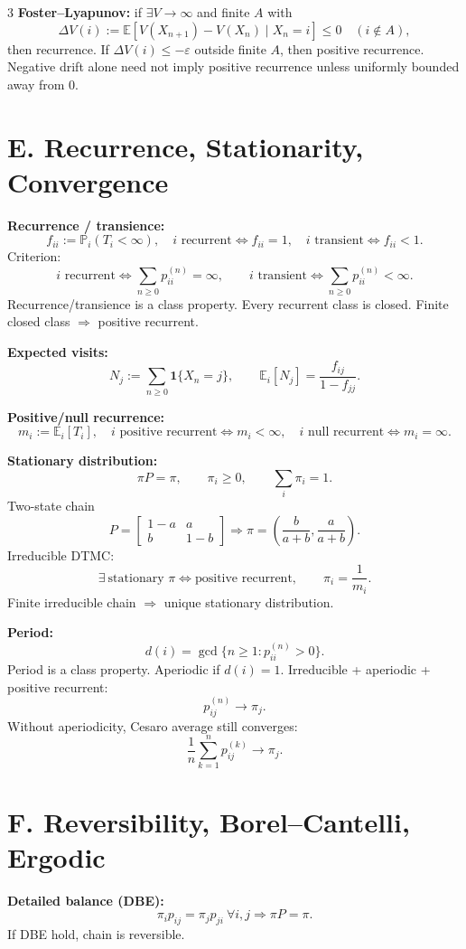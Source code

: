\documentclass[8pt]{extarticle}
\newcommand{\PP}{\mathbb{P}}
\newcommand{\E}{\mathbb{E}}
\newcommand{\1}{\mathbf{1}}
\begin{document}
\begin{multicols*}{3}
\textbf{Foster--Lyapunov:} if $\exists V\to\infty$ and finite $A$ with
\[
\Delta V(i):=\E[V(X_{n+1})-V(X_n)\mid X_n=i]\le0 \quad (i\notin A),
\]
then recurrence. If $\Delta V(i)\le-\varepsilon$ outside finite $A$, then positive recurrence.
Negative drift alone need not imply positive recurrence unless uniformly bounded away from $0$.

\section*{E. Recurrence, Stationarity, Convergence}
\textbf{Recurrence / transience:}
\[
f_{ii}:=\PP_i(T_i<\infty),\quad
i\text{ recurrent}\iff f_{ii}=1,\quad
i\text{ transient}\iff f_{ii}<1.
\]
Criterion:
\[
i\text{ recurrent}\iff \sum_{n\ge0}p_{ii}^{(n)}=\infty,
\qquad
i\text{ transient}\iff \sum_{n\ge0}p_{ii}^{(n)}<\infty.
\]
Recurrence/transience is a class property.
Every recurrent class is closed. Finite closed class $\Rightarrow$ positive recurrent.

\textbf{Expected visits:}
\[
N_j:=\sum_{n\ge0}\1\{X_n=j\},\qquad
\E_i[N_j]=\frac{f_{ij}}{1-f_{jj}}.
\]

\textbf{Positive/null recurrence:}
\[
m_i:=\E_i[T_i],\quad
i\text{ positive recurrent}\iff m_i<\infty,\quad
i\text{ null recurrent}\iff m_i=\infty.
\]

\textbf{Stationary distribution:}
\[
\pi P=\pi,\qquad \pi_i\ge0,\qquad \sum_i\pi_i=1.
\]
Two-state chain
\[
P=\begin{bmatrix}1-a&a\\ b&1-b\end{bmatrix}
\Rightarrow
\pi=\left(\frac{b}{a+b},\frac{a}{a+b}\right).
\]
Irreducible DTMC:
\[
\exists\ \text{stationary }\pi \iff \text{positive recurrent},
\qquad \pi_i=\frac{1}{m_i}.
\]
Finite irreducible chain $\Rightarrow$ unique stationary distribution.

\textbf{Period:}
\[
d(i)=\gcd\{n\ge1:p_{ii}^{(n)}>0\}.
\]
Period is a class property. Aperiodic if $d(i)=1$.
Irreducible + aperiodic + positive recurrent:
\[
p_{ij}^{(n)}\to \pi_j.
\]
Without aperiodicity, Cesaro average still converges:
\[
\frac1n\sum_{k=1}^n p_{ij}^{(k)}\to \pi_j.
\]

\section*{F. Reversibility, Borel--Cantelli, Ergodic}
\textbf{Detailed balance (DBE):}
\[
\pi_i p_{ij}=\pi_j p_{ji}\ \forall i,j
\Rightarrow \pi P=\pi.
\]
If DBE hold, chain is reversible.


\end{multicols*}
\end{document}

